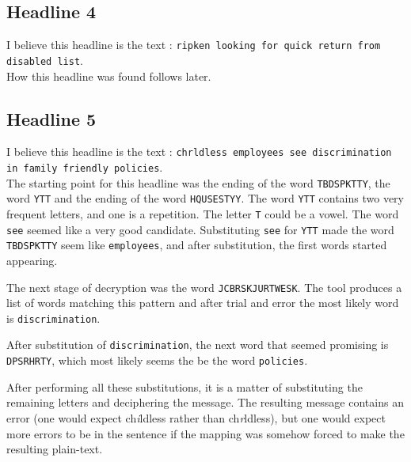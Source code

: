 \documentclass[12pt,a4paper,onecolumn]{article}
\begin{document}
\subsection{Headline 4}
I believe this headline is the text : \texttt{ripken looking for quick return from disabled list}.\\
How this headline was found follows later.
\subsection{Headline 5}
I believe this headline is the text : \texttt{chrldless employees see discrimination in family friendly policies}.\\

The starting point for this headline was the ending of the word \texttt{TBDSPKTTY}, the word \texttt{YTT} and the ending of the word \texttt{HQUSESTYY}. The word \texttt{YTT} contains two very frequent letters, and one is a repetition. The letter \texttt{T} could be a vowel. The word \texttt{see} seemed like a very good candidate. Substituting \texttt{see} for \texttt{YTT} made the word \texttt{TBDSPKTTY} seem like \texttt{employees}, and after substitution, the first words started appearing.

The next stage of decryption was the word \texttt{JCBRSKJURTWESK}. The tool \citep{tool:design215} produces a list of words matching this pattern and after trial and error the most likely word is \texttt{discrimination}. 

After substitution of \texttt{discrimination}, the next word that seemed promising is \texttt{DPSRHRTY}, which most likely seems the be the word \texttt{policies}.

After performing all these substitutions, it is a matter of substituting the remaining letters and deciphering the message. The resulting message contains an error (one would expect ch\textit{i}ldless rather than ch\textit{r}ldless), but one would expect more errors to be in the sentence if the mapping was somehow forced to make the resulting plain-text.
\end{document}
